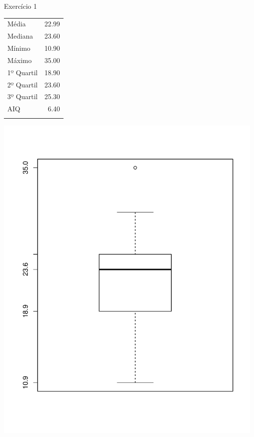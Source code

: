 \documentclass[
  ignorenonframetext,
  serif,
  professionalfont,
  usenames,
  dvipsnames,
  aspectratio = 169]{beamer}
\def\beginAHalfColumn{\begin{minipage}{0.49\textwidth}}%
\def\endColumns{\end{minipage}}%
\begin{document}
\begin{frame}{Exercício 1}
\label{exercuxedcio-1-2}
\beginAHalfColumn

\begin{longtable}[]{@{}lr@{}}
\toprule\noalign{}
\endhead
Média & 22.99 \\
Mediana & 23.60 \\
Mínimo & 10.90 \\
Máximo & 35.00 \\
1º Quartil & 18.90 \\
2º Quartil & 23.60 \\
3º Quartil & 25.30 \\
AIQ & 6.40 \\
\bottomrule\noalign{}
\end{longtable}

\endColumns
\beginAHalfColumn

\begin{center}\includegraphics[width=0.9\linewidth]{exercicios-encontro2-solucao_files/figure-beamer/unnamed-chunk-5-1} \end{center}

\endColumns
\end{frame}
\end{document}

